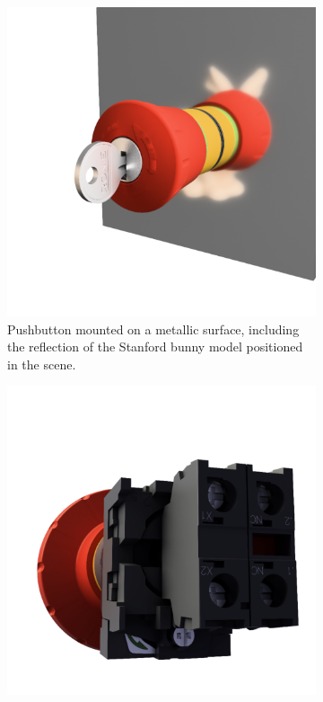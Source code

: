 \begin{figure}[H]
    \centering
    \hspace*{1cm}
    \begin{subfigure}[t]{0.38\textwidth}
        \includegraphics[width=\textwidth]{resources/demo-reflection.png}
        \caption{Pushbutton mounted on a metallic surface, including the reflection of the Stanford bunny model \cite{turkLevoy1994} positioned in the scene.}
        \label{fig:demo-reflection}
    \end{subfigure}
    \hfill
    \begin{subfigure}[t]{0.38\textwidth}
        \includegraphics[width=\textwidth]{resources/demo-color-bleeding.png}

\end{subfigure}
\end{figure}
